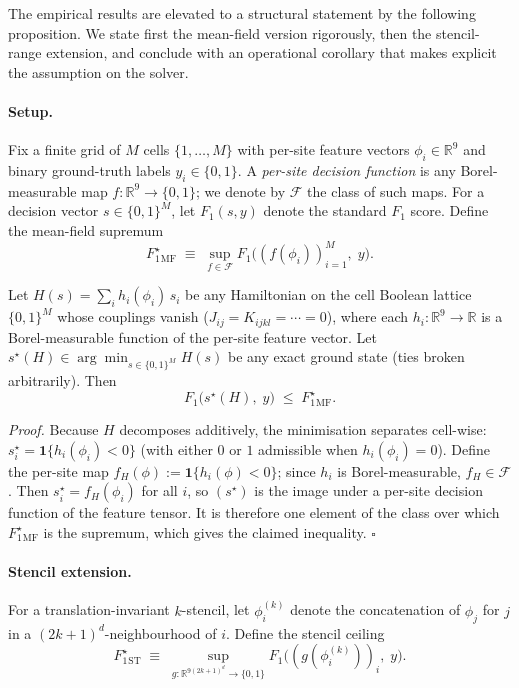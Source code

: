 \documentclass[12pt, a4paper, oneside]{report}
\begin{document}
The empirical results are elevated to a structural statement by the following proposition. We state first the mean-field version rigorously, then the stencil-range extension, and conclude with an operational corollary that makes explicit the assumption on the solver.

\paragraph{Setup.}
Fix a finite grid of $M$ cells $\{1, \dots, M\}$ with per-site feature vectors $\phi_i \in \mathbb{R}^9$ and binary ground-truth labels $y_i \in \{0, 1\}$. A \emph{per-site decision function} is any Borel-measurable map $f : \mathbb{R}^9 \to \{0,1\}$; we denote by $\mathcal{F}$ the class of such maps. For a decision vector $s \in \{0,1\}^M$, let $F_1(s, y)$ denote the standard $F_1$ score. Define the mean-field supremum
\[
    F_1^{\star}_{\mathrm{MF}} \;\equiv\; \sup_{f \in \mathcal{F}} F_1\!\bigl( (f(\phi_i))_{i=1}^M,\; y \bigr).
\]

\begin{tcolorbox}[title={Proposition 1 (Mean-field ceiling).}]
Let $H(s) = \sum_i h_i(\phi_i)\,s_i$ be any Hamiltonian on the cell Boolean lattice $\{0,1\}^M$ whose couplings vanish ($J_{ij} = K_{ijkl} = \cdots = 0$), where each $h_i : \mathbb{R}^9 \to \mathbb{R}$ is a Borel-measurable function of the per-site feature vector. Let $s^{\star}(H) \in \arg\min_{s \in \{0,1\}^M} H(s)$ be any exact ground state (ties broken arbitrarily). Then
\[
    F_1\!\bigl(s^{\star}(H),\; y\bigr) \;\le\; F_1^{\star}_{\mathrm{MF}}.
\]
\end{tcolorbox}

\noindent\emph{Proof.}
Because $H$ decomposes additively, the minimisation separates cell-wise:
$s^{\star}_i = \mathbf{1}\!\{h_i(\phi_i) < 0\}$ (with either $0$ or $1$ admissible when $h_i(\phi_i) = 0$). Define the per-site map $f_H(\phi) := \mathbf{1}\{h_i(\phi) < 0\}$; since $h_i$ is Borel-measurable, $f_H \in \mathcal{F}$. Then $s^{\star}_i = f_H(\phi_i)$ for all $i$, so $(s^{\star})$ is the image under a per-site decision function of the feature tensor. It is therefore one element of the class over which $F_1^{\star}_{\mathrm{MF}}$ is the supremum, which gives the claimed inequality. \hfill$\square$

\paragraph{Stencil extension.}
For a translation-invariant $k$-stencil, let $\phi_i^{(k)}$ denote the concatenation of $\phi_j$ for $j$ in a $(2k+1)^d$-neighbourhood of $i$. Define the stencil ceiling
\[
    F_1^{\star}_{\mathrm{ST}} \;\equiv\; \sup_{g : \mathbb{R}^{9(2k+1)^d} \to \{0,1\}} F_1\!\bigl( (g(\phi_i^{(k)}))_i,\; y \bigr).
\]
\end{document}
